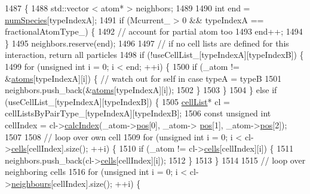 \begin{DoxyCode}
1487                                                                                                            
                    \{
1488     std::vector < atom* > neighbors;
1489 
1490     \textcolor{keywordtype}{int} end = \hyperlink{classsim_system_a9eea865e6dc1cff377b1e79c4d9c23f0}{numSpecies}[typeIndexA];
1491     \textcolor{keywordflow}{if} (Mcurrent\_ > 0 && typeIndexA == fractionalAtomType\_) \{
1492         \textcolor{comment}{// account for partial atom too}
1493         end++;
1494     \}
1495     neighbors.reserve(end);
1496 
1497     \textcolor{comment}{// if no cell lists are defined for this interaction, return all particles}
1498     \textcolor{keywordflow}{if} (!useCellList\_[typeIndexA][typeIndexB]) \{
1499         \textcolor{keywordflow}{for} (\textcolor{keywordtype}{unsigned} \textcolor{keywordtype}{int} i = 0; i < end; ++i) \{
1500             \textcolor{keywordflow}{if} (\_atom != &\hyperlink{classsim_system_a90421b19082f7fb8fc23b7264b1161e4}{atoms}[typeIndexA][i]) \{ \textcolor{comment}{// watch out for self in case typeA = typeB}
1501                 neighbors.push\_back(&\hyperlink{classsim_system_a90421b19082f7fb8fc23b7264b1161e4}{atoms}[typeIndexA][i]);
1502             \}
1503         \}
1504     \} \textcolor{keywordflow}{else} \textcolor{keywordflow}{if} (useCellList\_[typeIndexA][typeIndexB]) \{
1505         \hyperlink{classcell_list}{cellList}* cl = cellListsByPairType\_[typeIndexA][typeIndexB];
1506         \textcolor{keyword}{const} \textcolor{keywordtype}{unsigned} \textcolor{keywordtype}{int} cellIndex = cl->\hyperlink{classcell_list_aa6b843131cd487164a137571c7343cab}{calcIndex}(\_atom->\hyperlink{classatom_a3ae5f4880e7831d8b2c9fda72b4eb24a}{pos}[0], \_atom->
      \hyperlink{classatom_a3ae5f4880e7831d8b2c9fda72b4eb24a}{pos}[1], \_atom->\hyperlink{classatom_a3ae5f4880e7831d8b2c9fda72b4eb24a}{pos}[2]);
1507 
1508         \textcolor{comment}{// loop over own cell}
1509         \textcolor{keywordflow}{for} (\textcolor{keywordtype}{unsigned} \textcolor{keywordtype}{int} i = 0; i < cl->\hyperlink{classcell_list_a10bc0c3ae819293b1e88bc7d1bfdb2aa}{cells}[cellIndex].size(); ++i) \{
1510             \textcolor{keywordflow}{if} (\_atom != cl->\hyperlink{classcell_list_a10bc0c3ae819293b1e88bc7d1bfdb2aa}{cells}[cellIndex][i]) \{
1511                 neighbors.push\_back(cl->\hyperlink{classcell_list_a10bc0c3ae819293b1e88bc7d1bfdb2aa}{cells}[cellIndex][i]);
1512             \}
1513         \}
1514 
1515         \textcolor{comment}{// loop over neighboring cells}
1516         \textcolor{keywordflow}{for} (\textcolor{keywordtype}{unsigned} \textcolor{keywordtype}{int} i = 0; i < cl->\hyperlink{classcell_list_ada607886d0e5a20d710dde694d6d989f}{neighbours}[cellIndex].size(); ++i) \{

\end{DoxyCode}
